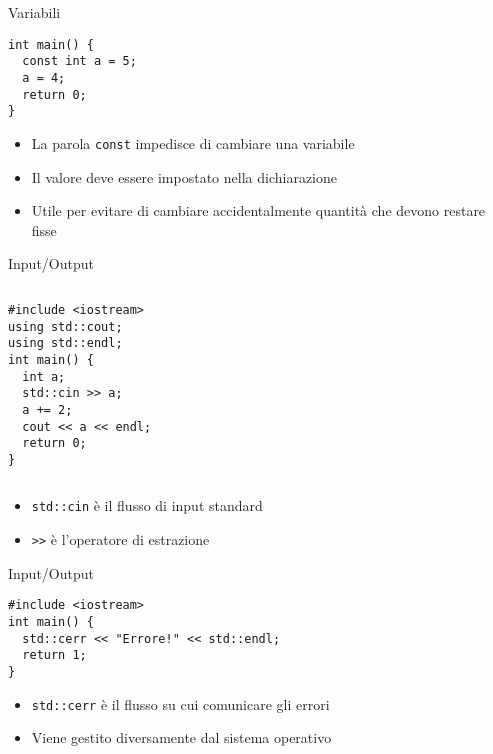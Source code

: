 \documentclass[xcolor=dvipsnames,handout]{beamer}
\begin{document}
\begin{frame}[fragile]{Variabili}
  \vfill
  \begin{lstlisting}
int main() {
  const int a = 5;
  a = 4;
  return 0;
}
  \end{lstlisting}
  \vfill
  \begin{itemize}
    \item La parola \lstinline$const$ impedisce di cambiare una variabile
    \vfill
    \item Il valore deve essere impostato nella dichiarazione
    \vfill
    \item Utile per evitare di cambiare accidentalmente quantità che devono restare fisse
  \end{itemize}
  \vfill
\end{frame}

\begin{frame}[fragile]{Input/Output}
  \vfill
  \begin{columns}[c]
    \vfill
    \begin{lstlisting}
#include <iostream>
using std::cout;
using std::endl;
int main() {
  int a;
  std::cin >> a;
  a += 2;
  cout << a << endl;
  return 0;
}
    \end{lstlisting}
    \vfill
    \vfill
    \begin{center}\end{center}
    \vfill
  \end{columns}
  \vfill
  \begin{itemize}
    \item \lstinline$std::cin$ è il flusso di input standard
    \vfill
    \item \lstinline$>>$ è l'operatore di \alert{estrazione}
  \end{itemize}
  \vfill
\end{frame}

\begin{frame}[fragile]{Input/Output}
  \vfill
  \begin{lstlisting}
#include <iostream>
int main() {
  std::cerr << "Errore!" << std::endl;
  return 1;
}
  \end{lstlisting}
  \vfill
  \begin{itemize}
    \item \lstinline$std::cerr$ è il flusso su cui comunicare gli errori
    \vfill
    \item Viene gestito diversamente dal sistema operativo
  \end{itemize}
  \vfill
\end{frame}
\end{document}
